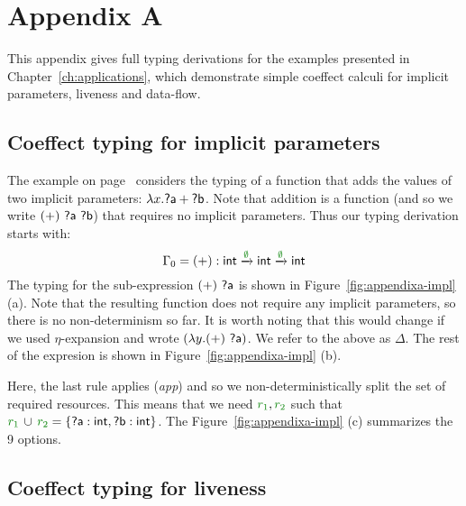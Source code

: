 
\chapter{Appendix A} 
\label{ch:appendix} 

This appendix gives full typing derivations for the examples presented in Chapter~\ref{ch:applications},
which demonstrate simple coeffect calculi for implicit parameters, liveness and data-flow.


\section{Coeffect typing for implicit parameters}
\label{sec:appendixa-implicit} 

The example on page~\pageref{pg:applications-flat-paramsex} considers the typing of a function that
adds the values of two implicit parameters: $\lambda x.\ident{?a} + \ident{?b}$. Note that addition
is a function (and so we write $(+)~\ident{?a}~\ident{?b}$) that requires no implicit parameters.
Thus our typing derivation starts with: 
%
\begin{equation*}
\Gamma_0 = (+):\ident{int}\xrightarrow{\cclrd{\emptyset}}\ident{int}\xrightarrow{\cclrd{\emptyset}}\ident{int}
\end{equation*}
%
The typing for the sub-expression $(+)~\ident{?a}$ is shown in Figure~\ref{fig:appendixa-impl} (a).
Note that the resulting function does not require any implicit parameters, so there is no non-determinism so far.
It is worth noting that this would change if we used $\eta$-expansion and wrote $(\lambda y.(+)~\ident{?a})$.
We refer to the above as $\Delta$. The rest of the expresion is shown in Figure~\ref{fig:appendixa-impl} (b).

Here, the last rule applies (\emph{app}) and so we non-deterministically split the set of required resources.
This means that we need $\cclrd{r_1}, \cclrd{r_2}$ such that $\cclrd{r_1}\,\cup\,\cclrd{r_2}=\{\ident{?a}:\ident{int}, \ident{?b}:\ident{int} \}$.
The Figure~\ref{fig:appendixa-impl} (c) summarizes the 9 options.


\section{Coeffect typing for liveness}
\label{sec:appendixa-liveness} 

